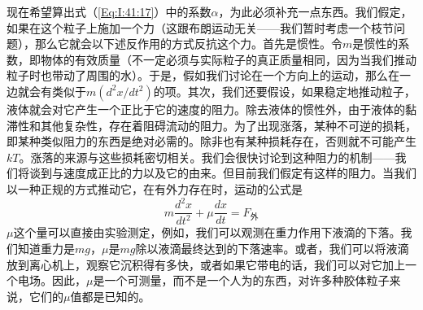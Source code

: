 现在希望算出式（\ref{Eq:I:41:17}）中的系数$\alpha$，为此必须补充一点东西。我们假定，如果在这个粒子上施加一个力（这跟布朗运动无关——我们暂时考虑一个枝节问题），那么它就会以下述反作用的方式反抗这个力。首先是惯性。令$m$是惯性的系数，即物体的有效质量（不一定必须与实际粒子的真正质量相同，因为当我们推动粒子时也带动了周围的水）。于是，假如我们讨论在一个方向上的运动，那么在一边就会有类似于$m(d^2x/dt^2)$的项。其次，我们还要假设，如果稳定地推动粒子，液体就会对它产生一个正比于它的速度的阻力。除去液体的惯性外，由于液体的黏滞性和其他复杂性，存在着阻碍流动的阻力。为了出现涨落，某种不可逆的损耗，即某种类似阻力的东西是绝对必需的。除非也有某种损耗存在，否则就不可能产生$kT$。涨落的来源与这些损耗密切相关。我们会很快讨论到这种阻力的机制——我们将谈到与速度成正比的力以及它的由来。但目前我们假定有这样的阻力。当我们以一种正规的方式推动它，在有外力存在时，运动的公式是
\begin{equation}
    \label{Eq:I:41:19}
    m\frac{d^2x}{dt^2} + \mu\frac{dx}{dt} = F_\text{外}
\end{equation}
$\mu$这个量可以直接由实验测定，例如，我们可以观测在重力作用下液滴的下落。我们知道重力是$mg$，$\mu$是$mg$除以液滴最终达到的下落速率。或者，我们可以将液滴放到离心机上，观察它沉积得有多快，或者如果它带电的话，我们可以对它加上一个电场。因此，$\mu$是一个可测量，而不是一个人为的东西，对许多种胶体粒子来说，它们的$\mu$值都是已知的。

